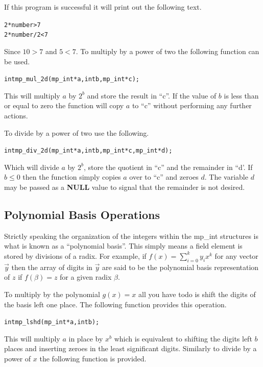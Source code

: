 \documentclass[synpaper]{book}
\begin{document}
If this program is successful it will print out the following text.

\begin{alltt}
2*number > 7
2*number/2 < 7
\end{alltt}

Since $10 > 7$ and $5 < 7$.  To multiply by a power of two the following function can be used.

\begin{alltt}
int mp_mul_2d(mp_int * a, int b, mp_int * c);
\end{alltt}

This will multiply $a$ by $2^b$ and store the result in ``c''.  If the value of $b$ is less than or equal to 
zero the function will copy $a$ to ``c'' without performing any further actions.  

To divide by a power of two use the following.

\begin{alltt}
int mp_div_2d (mp_int * a, int b, mp_int * c, mp_int * d);
\end{alltt}
Which will divide $a$ by $2^b$, store the quotient in ``c'' and the remainder in ``d'.  If $b \le 0$ then the
function simply copies $a$ over to ``c'' and zeroes $d$.  The variable $d$ may be passed as a \textbf{NULL}
value to signal that the remainder is not desired.

\subsection{Polynomial Basis Operations}

Strictly speaking the organization of the integers within the mp\_int structures is what is known as a 
``polynomial basis''.  This simply means a field element is stored by divisions of a radix.  For example, if
$f(x) = \sum_{i=0}^{k} y_ix^k$ for any vector $\vec y$ then the array of digits in $\vec y$ are said to be 
the polynomial basis representation of $z$ if $f(\beta) = z$ for a given radix $\beta$.  

To multiply by the polynomial $g(x) = x$ all you have todo is shift the digits of the basis left one place.  The
following function provides this operation.

\begin{alltt}
int mp_lshd (mp_int * a, int b);
\end{alltt}

This will multiply $a$ in place by $x^b$ which is equivalent to shifting the digits left $b$ places and inserting zeroes
in the least significant digits.  Similarly to divide by a power of $x$ the following function is provided.
\end{document}
